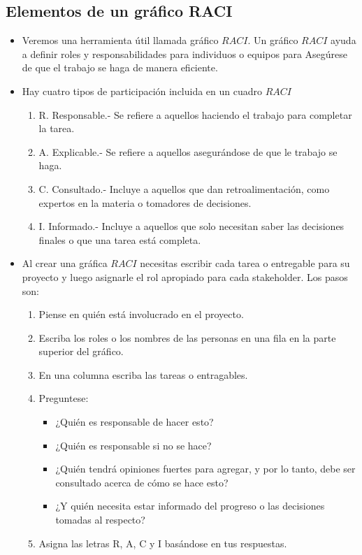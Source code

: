 \documentclass[10pt]{book}
\begin{document}
	\subsection{Elementos de un gráfico RACI}

	\begin{itemize}
	    
	    \item Veremos una herramienta útil llamada gráfico $RACI$. Un gráfico $RACI$ ayuda a definir roles y responsabilidades para individuos o equipos para Asegúrese de que el trabajo se haga de manera eficiente.

	    \item Hay cuatro tipos de participación incluida en un cuadro $RACI$

	    \begin{enumerate}[1.]
		\item R. Responsable.- Se refiere a aquellos haciendo el trabajo para completar la tarea.
		\item A. Explicable.-  Se refiere a aquellos asegurándose de que le trabajo se haga.
		\item C. Consultado.- Incluye a aquellos que dan retroalimentación, como expertos en la materia o tomadores de decisiones.
		\item I. Informado.- Incluye a aquellos que solo necesitan saber las decisiones finales o que una tarea está completa.
	    \end{enumerate}

	    \item Al crear una gráfica $RACI$ necesitas escribir cada tarea o entregable para su proyecto y luego asignarle el rol apropiado para cada stakeholder. Los pasos son:

	    \begin{enumerate}[1.]
		\item Piense en quién está involucrado en el proyecto.
		\item Escriba los roles o los nombres de las personas en una fila en la parte superior del gráfico.
		\item En una columna escriba las tareas o entragables.
		\item Preguntese:

		\begin{itemize}
		    \item ¿Quién es responsable de hacer esto?
		    \item ¿Quién es responsable si no se hace?
		    \item ¿Quién tendrá opiniones fuertes para agregar, y por lo tanto, debe ser consultado acerca de cómo se hace esto?
		    \item ¿Y quién necesita estar informado del progreso o las decisiones tomadas al respecto? 
		\end{itemize}
		\item Asigna las letras R, A, C y I basándose en tus respuestas.
	    \end{enumerate}
	\end{itemize}
\end{document}

